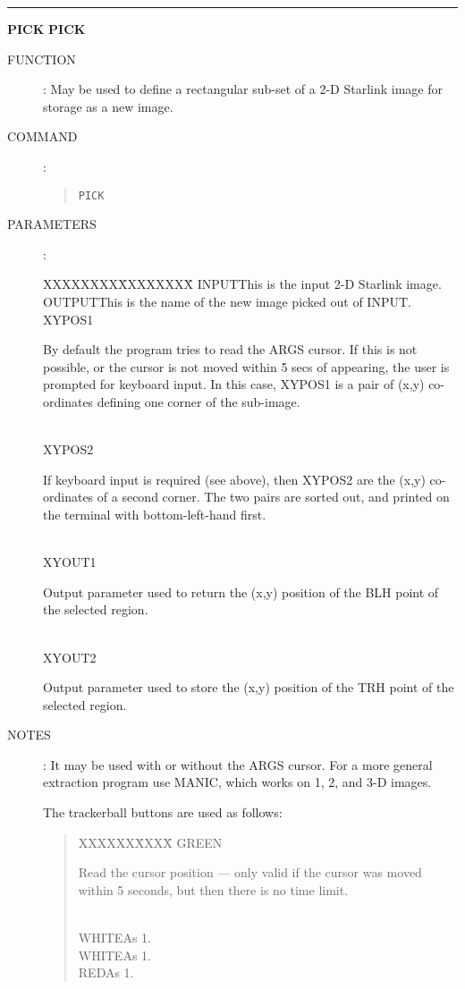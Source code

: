 \goodbreak
\rule{\textwidth}{0.3mm}
{\Large {\bf PICK} \hfill {\bf PICK}}
\begin{description}
\item [FUNCTION]:
May be used to define a rectangular sub-set of a 2-D Starlink image for
storage as a new image.
\item [COMMAND]:
\begin{quote}
{\tt PICK}
\end{quote}
\item [PARAMETERS] :
\begin{tabbing}
XXXXXXXX\=XXXXXXXX\=\kill
INPUT\>\>This is the input 2-D Starlink image.\\
OUTPUT\>\>This is the name of the new image picked out of INPUT.\\
XYPOS1\>\>\begin{minipage}[t]{100mm}
By default the program tries to read the ARGS cursor.
If this is not possible, or the cursor is not moved within 5 secs of appearing,
the user is prompted for keyboard input.
In this case, XYPOS1 is a pair of (x,y) co-ordinates defining one corner of the
sub-image.
\end{minipage}\\
XYPOS2\>\>\begin{minipage}[t]{100mm}
If keyboard input is required (see above), then XYPOS2 are the (x,y)
co-ordinates of a second corner.
The two pairs are sorted out, and printed on the terminal with bottom-left-hand
first.
\end{minipage}\\
XYOUT1\>\>\begin{minipage}[t]{100mm}
Output parameter used to return the (x,y) position of the BLH point of the
selected region.
\end{minipage}\\
XYOUT2\>\>\begin{minipage}[t]{100mm}
Output parameter used to store the (x,y) position of the TRH point of the
selected region.
\end{minipage}
\end{tabbing}
\item [NOTES]:
It may be used with or without the ARGS cursor.
For a more general extraction program use MANIC, which works on 1, 2, and 3-D
images.

The trackerball buttons are used as follows:
\begin{quote}
\begin{tabbing}
XXXXXX\=XXXX\=\kill
GREEN\>\begin{minipage}[t]{100mm}
Read the cursor position --- only valid if the  cursor was moved within 5
seconds, but then there is no time limit.
\end{minipage}\\
WHITE\>As 1.\\
WHITE\>As 1.\\
RED\>As 1.
\end{tabbing}
\end{quote}
\end{description}

